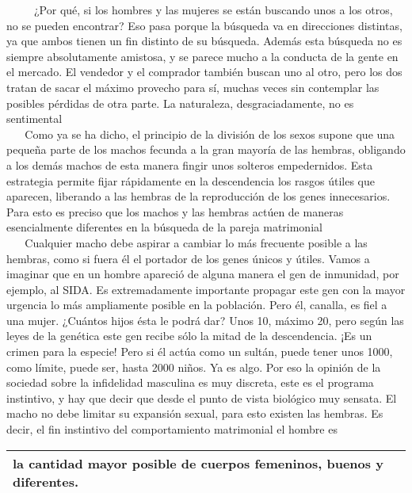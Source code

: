 ~ ~ ~ ¿Por qué, si los hombres y las mujeres se están buscando unos a
los otros, no se pueden encontrar? Eso pasa porque la búsqueda va en
direcciones distintas, ya que ambos tienen un fin distinto de su
búsqueda. Además esta búsqueda no es siempre absolutamente amistosa, y
se parece mucho a la conducta de la gente en el mercado. El vendedor y
el comprador también buscan uno al otro, pero los dos tratan de sacar el
máximo provecho para sí, muchas veces sin contemplar las posibles
pérdidas de otra parte. La naturaleza, desgraciadamente, no es
sentimental\\
\hspace*{0.333em} ~ ~ Como ya se ha dicho, el principio de la división
de los sexos supone que una pequeña parte de los machos fecunda a la
gran mayoría de las hembras, obligando a los demás machos de esta manera
fingir unos solteros empedernidos. Esta estrategia permite fijar
rápidamente en la descendencia los rasgos útiles que aparecen, liberando
a las hembras de la reproducción de los genes innecesarios. Para esto es
preciso que los machos y las hembras actúen de maneras esencialmente
diferentes en la búsqueda de la pareja matrimonial\\
\hspace*{0.333em} ~ ~ Cualquier macho debe aspirar a cambiar lo más
frecuente posible a las hembras, como si fuera él el portador de los
genes únicos y útiles. Vamos a imaginar que en un hombre apareció de
alguna manera el gen de inmunidad, por ejemplo, al SIDA. Es
extremadamente importante propagar este gen con la mayor urgencia lo más
ampliamente posible en la población. Pero él, canalla, es fiel a una
mujer. ¿Cuántos hijos ésta le podrá dar? Unos 10, máximo 20, pero según
las leyes de la genética este gen recibe sólo la mitad de la
descendencia. ¡Es un crimen para la especie! Pero si él actúa como un
sultán, puede tener unos 1000, como límite, puede ser, hasta 2000 niños.
Ya es algo. Por eso la opinión de la sociedad sobre la infidelidad
masculina es muy discreta, este es el programa instintivo, y hay que
decir que desde el punto de vista biológico muy sensata. El macho no
debe limitar su expansión sexual, para esto existen las hembras. Es
decir, el fin instintivo del comportamiento matrimonial el hombre es

\begin{longtable}[]{@{}l@{}}
\toprule
la cantidad mayor posible de cuerpos femeninos, buenos y
diferentes.\tabularnewline
\bottomrule
\end{longtable}

